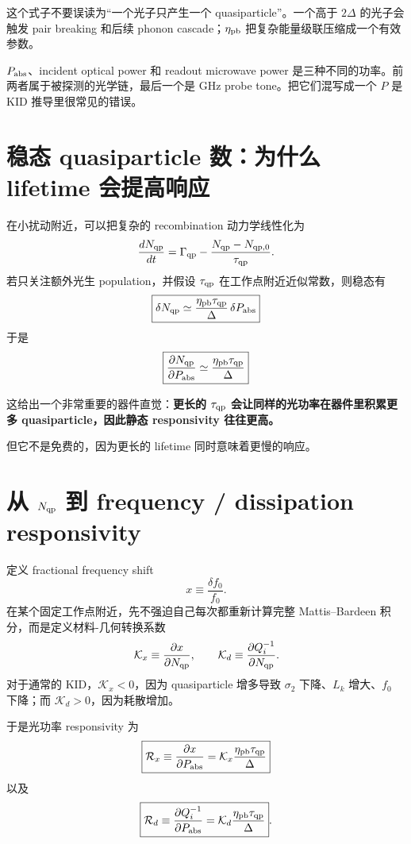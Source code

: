 \documentclass[11pt,a4paper,openany]{ctexrep}
\begin{document}
这个式子不要误读为“一个光子只产生一个 quasiparticle”。一个高于 $2\Delta$ 的光子会触发 pair breaking 和后续 phonon cascade；$\eta_{\rm pb}$ 把复杂能量级联压缩成一个有效参数。

\begin{mistakebox}
$P_{\rm abs}$、incident optical power 和 readout microwave power 是三种不同的功率。前两者属于被探测的光学链，最后一个是 GHz probe tone。把它们混写成一个 $P$ 是 KID 推导里很常见的错误。
\end{mistakebox}

\section{稳态 quasiparticle 数：为什么 lifetime 会提高响应}

在小扰动附近，可以把复杂的 recombination 动力学线性化为
\[
\frac{dN_{\rm qp}}{dt}=\Gamma_{\rm qp}-\frac{N_{\rm qp}-N_{\rm qp,0}}{\tau_{\rm qp}}.
\]
若只关注额外光生 population，并假设 $\tau_{\rm qp}$ 在工作点附近近似常数，则稳态有
\[
\boxed{
\delta N_{\rm qp}
\simeq
\frac{\eta_{\rm pb}\tau_{\rm qp}}{\Delta}
\,\delta P_{\rm abs}
}
\]
于是
\[
\boxed{
\frac{\partial N_{\rm qp}}{\partial P_{\rm abs}}
\simeq
\frac{\eta_{\rm pb}\tau_{\rm qp}}{\Delta}
}
\]

这给出一个非常重要的器件直觉：\textbf{更长的 $\tau_{\rm qp}$ 会让同样的光功率在器件里积累更多 quasiparticle，因此静态 responsivity 往往更高。}

但它不是免费的，因为更长的 lifetime 同时意味着更慢的响应。

\section{从 $N_{\rm qp}$ 到 frequency / dissipation responsivity}

定义 fractional frequency shift
\[
x\equiv \frac{\delta f_0}{f_0}.
\]
在某个固定工作点附近，先不强迫自己每次都重新计算完整 Mattis--Bardeen 积分，而是定义材料-几何转换系数
\[
\mathcal K_x\equiv \frac{\partial x}{\partial N_{\rm qp}},
\qquad
\mathcal K_d\equiv
\frac{\partial Q_i^{-1}}{\partial N_{\rm qp}}.
\]
对于通常的 KID，$\mathcal K_x<0$，因为 quasiparticle 增多导致 $\sigma_2$ 下降、$L_k$ 增大、$f_0$ 下降；而 $\mathcal K_d>0$，因为耗散增加。

于是光功率 responsivity 为
\[
\boxed{
\mathcal R_x
\equiv
\frac{\partial x}{\partial P_{\rm abs}}
=\mathcal K_x
\frac{\eta_{\rm pb}\tau_{\rm qp}}{\Delta}
}
\]
以及
\[
\boxed{
\mathcal R_d
\equiv
\frac{\partial Q_i^{-1}}{\partial P_{\rm abs}}
=\mathcal K_d
\frac{\eta_{\rm pb}\tau_{\rm qp}}{\Delta}
}.
\]
\end{document}
